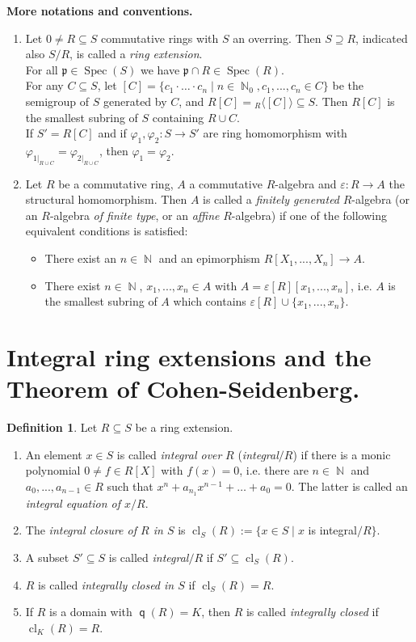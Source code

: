 \documentclass[12pt,a4paper]{report}
\theoremstyle{definition}
\newtheorem{defn}[theorem]{Definition}
\theoremstyle{num.custom-title}
\DeclareMathOperator{\N}{\mathbb{N}}
\DeclareMathOperator{\sse}{\subseteq}
\DeclareMathOperator{\cl}{cl}
\DeclareMathOperator{\Spec}{Spec}
\DeclareMathOperator{\q}{\mathsf{q}}
\newcommand{\p}{\mathfrak{p}}
\renewcommand{\epsilon}{\varepsilon}
\renewcommand{\phi}{\varphi}
\begin{document}
\textbf{More notations and conventions.}
\begin{enumerate}
\item Let $0 \neq R \sse S$ commutative rings with $S$ an overring. Then $S \supseteq R$, indicated also $S/R$, is called a \emph{ring extension}.\\
For all $\p \in \Spec(S)$ we have $\p \cap R \in \Spec(R)$.\\
For any $C \sse S$, let $[C] = \{ c_1 \cdot \ldots \cdot c_n \mid n \in \N _0, c_1,...,c_n \in C \}$ be the semigroup of $S$ generated by $C$, and $R[C] = {}_R \langle [C] \rangle \sse S$. Then $R[C]$ is the smallest subring of $S$ containing $R \cup C$.\\
If $S'=R[C]$ and if $\phi_1,\phi_2 : S \to S'$ are ring homomorphism with $\phi_{1|_{R \cup C}} = \phi_{2|_{R \cup C}}$, then $\phi_1 = \phi_2$.
\item Let $R$ be a commutative ring, $A$ a commutative $R$-algebra and $\epsilon : R \to A$ the structural homomorphism. Then $A$ is called a \emph{finitely generated} $R$-algebra (or an $R$-algebra \emph{of finite type}, or an \emph{affine} $R$-algebra) if one of the following equivalent conditions is satisfied:
\begin{itemize}
\item There exist an $n \in \N$ and an epimorphism $R[X_1,...,X_n] \to A$.
\item There exist $n \in \N$, $x_1,...,x_n \in A$ with $A= \epsilon[R] [x_1,...,x_n]$, i.e. $A$ is the smallest subring of $A$ which contains $\epsilon[R] \cup \{x_1,...,x_n\}$.
\end{itemize}
\end{enumerate}

\section{Integral ring extensions and the Theorem of Cohen-Seidenberg.}

\begin{defn}
Let $R \sse S$ be a ring extension.
\begin{enumerate}
\item An element $x \in S$ is called \emph{integral over} $R$ (\emph{integral}$/R$) if there is a monic polynomial $0 \neq f \in R[X]$ with $f(x)=0$, i.e. there are $n \in \N$ and $a_0,...,a_{n-1} \in R$  such that $x^n+a_{n_1}x^{n-1} + \ldots + a_0 = 0$. The latter is called an \emph{integral equation of $x/R$}.
\item The \emph{integral closure of $R$ in $S$} is $\cl_S(R) := \{x \in S \mid x$ is integral$/R\}$.
\item A subset $S' \sse S$ is called \emph{integral}$/R$ if $S' \sse \cl_S(R)$.
\item $R$ is called \emph{integrally closed in $S$} if $\cl_S(R)=R$.
\item If $R$ is a domain with $\q(R)=K$, then $R$ is called \emph{integrally closed} if $\cl_K(R)=R$.
\end{enumerate}
\end{defn}
\end{document}

